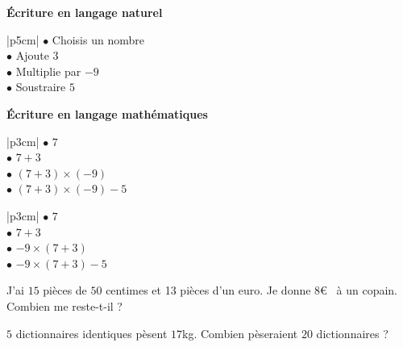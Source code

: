 \documentclass[a4paper,10pt]{report}
\begin{document}
\vspace{-2mm}
\begin{meth}

\noindent \begin{minipage}{7cm}

\begin{center}
\textbf{Écriture en langage naturel}
\end{center}
\begin{center}
\renewcommand{\arraystretch}{1.1}
\begin{tabular}{|p{5cm}|}
\hline
$\bullet$ Choisis un nombre\\
$\bullet$ Ajoute $3$\\
$\bullet$ Multiplie par $-9$\\
$\bullet$ Soustraire $5$ \\\hline
\end{tabular}
\end{center}
\end{minipage}
\hspace{1cm}
\begin{minipage}{8.2cm}

\begin{center}
\textbf{Écriture en langage mathématiques}
\end{center}
\begin{minipage}{4cm}
\renewcommand{\arraystretch}{1.1}
\begin{tabular}{|p{3cm}|}
\hline
$\bullet$ $7$ \\
$\bullet$ $7+3$ \\
$\bullet$ $(7+3) \times (-9)$ \\
$\bullet$ $(7+3) \times (-9) -5$ \\\hline
\end{tabular}
\end{minipage}
\begin{minipage}{4cm}
\renewcommand{\arraystretch}{1.1}
\begin{tabular}{|p{3cm}|}
\hline
$\bullet$ $7$ \\
$\bullet$ $7+3$ \\
$\bullet$ $-9 \times (7+3)$ \\
$\bullet$ $-9 \times (7+3) -5$ \\\hline
\end{tabular}
\end{minipage}
\end{minipage}

\end{meth}

\begin{meth}
J'ai $15$ pièces de $50$ centimes et 13 pièces d'un euro. Je donne $8$\euro~ à un copain. Combien me reste-t-il ?

\noindent\grandscarreaux{\linewidth}{1.6cm}

\noindent $5$ dictionnaires identiques pèsent $17$kg. Combien pèseraient $20$ dictionnaires ?

\noindent\grandscarreaux{\linewidth}{1.6cm}
\end{meth}
\end{document}
